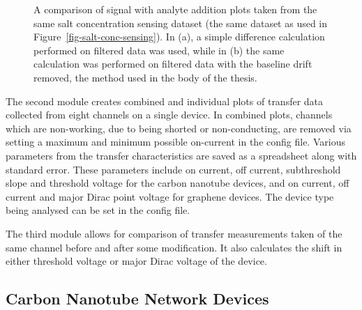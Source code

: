 \documentclass[
  a4paper,
]{scrbook}
\begin{document}
\begin{figure}
\begin{minipage}[t]{0.50\linewidth}
{{}

}

\subcaption{\label{fig-spaa-detrend}}
\end{minipage}%

\caption{\label{fig-spaa-plot-comparison}A comparison of signal with
analyte addition plots taken from the same salt concentration sensing
dataset (the same dataset as used in
Figure~\ref{fig-salt-conc-sensing}). In (a), a simple difference
calculation performed on filtered data was used, while in (b) the same
calculation was performed on filtered data with the baseline drift
removed, the method used in the body of the thesis.}

\end{figure}

The second module creates combined and individual plots of transfer data
collected from eight channels on a single device. In combined plots,
channels which are non-working, due to being shorted or non-conducting,
are removed via setting a maximum and minimum possible on-current in the
config file. Various parameters from the transfer characteristics are
saved as a spreadsheet along with standard error. These parameters
include on current, off current, subthreshold slope and threshold
voltage for the carbon nanotube devices, and on current, off current and
major Dirac point voltage for graphene devices. The device type being
analysed can be set in the config file.

The third module allows for comparison of transfer measurements taken of
the same channel before and after some modification. It also calculates
the shift in either threshold voltage or major Dirac voltage of the
device.

\hypertarget{carbon-nanotube-network-devices}{%
\subsection{Carbon Nanotube Network
Devices}\label{carbon-nanotube-network-devices}}
\end{document}
